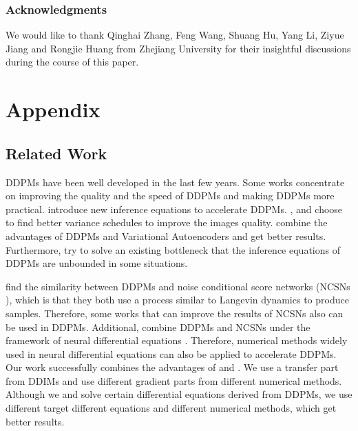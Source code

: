 \documentclass{article}
\begin{document}
\subsubsection*{Acknowledgments}

We would like to thank Qinghai Zhang, Feng Wang, Shuang Hu, Yang Li, Ziyue Jiang and Rongjie Huang from Zhejiang University for their insightful discussions during the course of this paper.





\appendix
\section{Appendix}

\subsection{Related Work}
\label{gen_inst}

DDPMs have been well developed in the last few years. Some works concentrate on improving the quality and the speed of DDPMs and making DDPMs more practical. \citet{Song2020a} introduce new inference equations to accelerate DDPMs. \citet{Nichol2021}, \citet{Watson2021} and \citet{Kong2021} choose to find better variance schedules to improve the images quality. \citet{Vahdat2021} combine the advantages of DDPMs and Variational Autoencoders and get better results. Furthermore, \citet{Kim2021} try to solve an existing bottleneck that the inference equations of DDPMs are unbounded in some situations.

\citet{Song2020} find the similarity between DDPMs and noise conditional score networks (NCSNs \citep{Song2020c}), which is that they both use a process similar to Langevin dynamics to produce samples. Therefore, some works \citep{Song2020b, Kim2021} that can improve the results of NCSNs also can be used in DDPMs. Additional, \citet{Song2020} combine DDPMs and NCSNs under the framework of neural differential equations \citep{chen2019, dupont2019}. Therefore, numerical methods widely used in neural differential equations can also be applied to accelerate DDPMs. Our work successfully combines the advantages of \citet{Song2020a} and \citet{Song2020}. We use a transfer part from DDIMs and use different gradient parts from different numerical methods. Although we and \citet{Song2020} solve certain differential equations derived from DDPMs, we use different target different equations and different numerical methods, which get better results.
\end{document}

